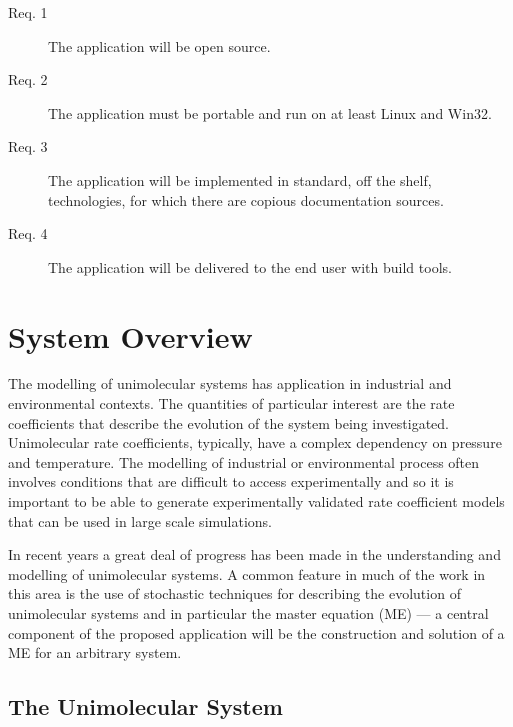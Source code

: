 \begin{description}
\item[Req. 1]{The application will be open source.}
\item[Req. 2]{The application must be portable and run on at least Linux and Win32.}
\item[Req. 3]{The application will be implemented in standard, off the shelf, technologies, for which there are copious documentation sources.}
\item[Req. 4]{The application will be delivered to the end user with build tools.}
\end{description}

\section{System Overview}\label{sec:SystemOverview}

The modelling of unimolecular systems has application in industrial and environmental contexts. The quantities of particular interest are the rate coefficients that describe the evolution of the system being investigated. Unimolecular rate coefficients, typically, have a complex dependency on pressure and temperature.  The modelling of industrial or environmental process often involves conditions that are difficult to access experimentally and so it is important to be able to generate experimentally validated rate coefficient models that can be used in large scale simulations.

In recent years a great deal of progress has been made in the understanding and modelling of unimolecular systems. A common feature in much of the work in this area is the use of stochastic techniques for describing the evolution of unimolecular systems and in particular the master equation (ME) --- a central component of the proposed application will be the construction and solution of a ME for an arbitrary system.

\subsection{The Unimolecular System
}\label{sec:TheUnimolecularSystem}

